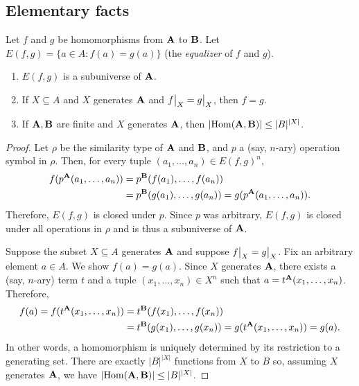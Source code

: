 \documentclass[12pt]{amsart}  %
\begin{document}
\subsection{Elementary facts}
\begin{lemma}
  \label{ex:1.16.6} 
  Let $f$ and $g$ be homomorphisms from $\mathbf{A}$ to $\mathbf{B}$.
  Let $E(f,g) = \{ a \in A : f(a) = g(a) \}$ (the \emph{equalizer} of $f$ and $g$). 
  \begin{enumerate}
    \item	$E(f,g)$ is a subuniverse of $\mathbf{A}$.
    \item If $X \subseteq A$ and $X$ generates $\mathbf{A}$ and
    $\restr{f}{X} = \restr{g}{X}$, then $f = g$. 
    \item If $\mathbf{A}, \mathbf{B}$ are finite and $X$ generates $\mathbf{A}$, 
    then $|\!\operatorname{Hom}(\mathbf{A},\mathbf{B})| \leq |B|^{|X|}$.
  \end{enumerate}
\end{lemma}
\begin{proof}
  Let $\rho$ be the similarity type of $\mathbf{A}$ and $\mathbf{B}$, and 
  $p$ a (say, $n$-ary) operation symbol in $\rho$. Then, 
  for every tuple $(a_1, \dots, a_n) \in E(f,g)^n$,
  \begin{align*}
    f(p^{\mathbf{A}}(a_1, \dots, a_n)) &= p^{\mathbf{B}}(f(a_1), \dots, f(a_n))\\
                                    &= p^{\mathbf{B}}(g(a_1), \dots, g(a_n))
                                     = g(p^{\mathbf{A}}(a_1, \dots, a_n)).
  \end{align*}
  Therefore, $E(f,g)$ is closed under $p$.  Since $p$ was arbitrary, 
  $E(f,g)$ is closed under all operations in $\rho$ and is thus a 
  subuniverse of $\mathbf{A}$.

  Suppose the subset $X \subseteq A$ generates $\mathbf{A}$ and suppose
  $\restr{f}{X} = \restr{g}{X}$.
  Fix an arbitrary element $a\in A$.  We show $f(a) = g(a)$.
  Since $X$ generates $\mathbf{A}$, there exists a (say, $n$-ary) term $t$ and 
  a tuple $(x_1, \dots, x_n) \in X^n$ such that 
  $a = t^{\mathbf{A}}(x_1, \dots, x_n)$. Therefore, 
  \begin{align*}
    f(a) = f(t^{\mathbf{A}}(x_1, \dots, x_n)) &= t^{\mathbf{B}}(f(x_1), \dots, f(x_n))\\
                                    &= t^{\mathbf{B}}(g(x_1), \dots, g(x_n))
                                     = g(t^{\mathbf{A}}(x_1, \dots, x_n)) = g(a).
  \end{align*}
  In other words, a homomorphism is uniquely determined by its restriction to 
  a generating set. There are exactly $|B|^{|X|}$ functions from $X$ to $B$ so, 
  assuming $X$ generates $\mathbf{A}$, we have
  $|\!\operatorname{Hom}(\mathbf{A},\mathbf{B})| \leq |B|^{|X|}$.
\end{proof}
\end{document}
